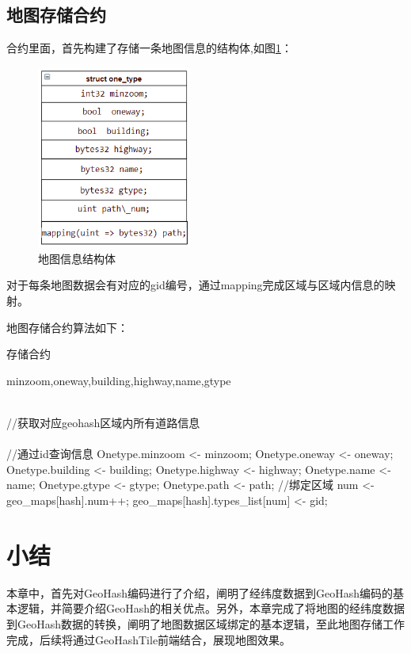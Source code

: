 \subsection{地图存储合约}
合约里面，首先构建了存储一条地图信息的结构体,如图\ref{地图信息结构体}：
\begin{figure}[H]
  \centering
  \includegraphics[width=2in]{images/16.png}
  \caption{地图信息结构体}\label{地图信息结构体} %
\end{figure}

对于每条地图数据会有对应的gid编号，通过mapping完成区域与区域内信息的映射。

地图存储合约算法如下：
\begin{algorithm}[H]
  \caption{存储合约} %
  \begin{algorithmic}[1] %
      \Require minzoom,oneway,building,highway,name,gtype
      \EndFunction  

       \\ 
          //获取对应geohash区域内所有道路信息 \\ 
      \EndFunction  
      \\  
          //通过id查询信息
          \State  Onetype.minzoom <- minzoom;
          \State  Onetype.oneway <- oneway;
          \State  Onetype.building <- building;
          \State  Onetype.highway <- highway;
          \State  Onetype.name <-name;
          \State  Onetype.gtype <- gtype;
          \State  Onetype.path <- path;
      \EndFunction  
        //绑定区域
          \State num <- geo\_maps[hash].num++;
          \State geo\_maps[hash].types\_list[num] <- gid;
      \EndFunction
  \end{algorithmic}  
\end{algorithm}

\section{小结}
本章中，首先对GeoHash编码进行了介绍，阐明了经纬度数据到GeoHash编码的基本逻辑，并简要介绍GeoHash的相关优点。另外，本章完成了将地图的经纬度数据到GeoHash数据的转换，阐明了地图数据区域绑定的基本逻辑，至此地图存储工作完成，后续将通过GeoHashTile前端结合，展现地图效果。